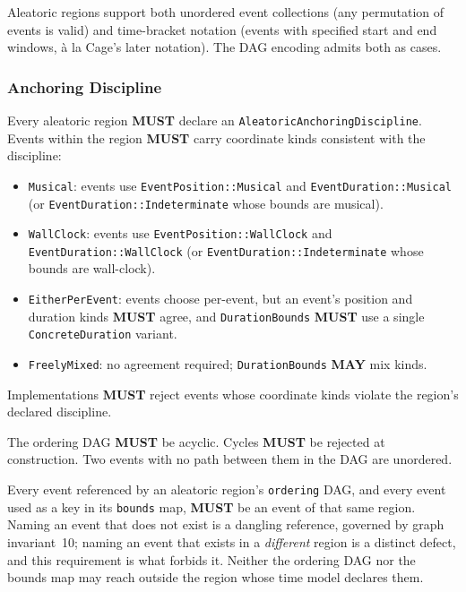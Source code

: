 \documentclass[11pt,letterpaper]{report}
\newcounter{requirement}[chapter]
\newcommand{\MUST}{\textbf{MUST}}
\newcommand{\MAY}{\textbf{MAY}}
\begin{document}
Aleatoric regions support both unordered event collections (any
permutation of events is valid) and time-bracket notation (events with
specified start and end windows, à la Cage's later notation). The DAG
encoding admits both as cases.

\subsubsection{Anchoring Discipline}
\label{sec:time:aleatoric-anchoring}
\label{sec:graph:aleatoric-discipline}

\begin{requirement}
  \label{req:time:aleatoric-anchoring-discipline}
  Every aleatoric region \MUST{} declare an
  \texttt{AleatoricAnchoringDiscipline}. Events within the region
  \MUST{} carry coordinate kinds consistent with the discipline:

  \begin{itemize}
    \item \texttt{Musical}: events use \texttt{EventPosition::Musical}
      and \texttt{EventDuration::Musical} (or
      \texttt{EventDuration::Indeterminate} whose bounds are musical).
    \item \texttt{WallClock}: events use
      \texttt{EventPosition::WallClock} and
      \texttt{EventDuration::WallClock} (or
      \texttt{EventDuration::Indeterminate} whose bounds are
      wall-clock).
    \item \texttt{EitherPerEvent}: events choose per-event, but an
      event's position and duration kinds \MUST{} agree, and
      \texttt{DurationBounds} \MUST{} use a single
      \texttt{ConcreteDuration} variant.
    \item \texttt{FreelyMixed}: no agreement required;
      \texttt{DurationBounds} \MAY{} mix kinds.
  \end{itemize}

  Implementations \MUST{} reject events whose coordinate kinds
  violate the region's declared discipline.
\end{requirement}

\begin{requirement}
  \label{req:time:ordering-dag-acyclic}
  The ordering DAG \MUST{} be acyclic. Cycles \MUST{} be rejected at
  construction. Two events with no path between them in the DAG are
  unordered.
\end{requirement}

\begin{requirement}
  \label{req:time:aleatoric-reference-locality}
  Every event referenced by an aleatoric region's \texttt{ordering}
  DAG, and every event used as a key in its \texttt{bounds} map,
  \MUST{} be an event of that same region. Naming an event that does
  not exist is a dangling reference, governed by graph
  invariant~10; naming an event that exists in a \emph{different}
  region is a distinct defect, and this requirement is what forbids
  it. Neither the ordering DAG nor the bounds map may reach outside
  the region whose time model declares them.
\end{requirement}
\end{document}
